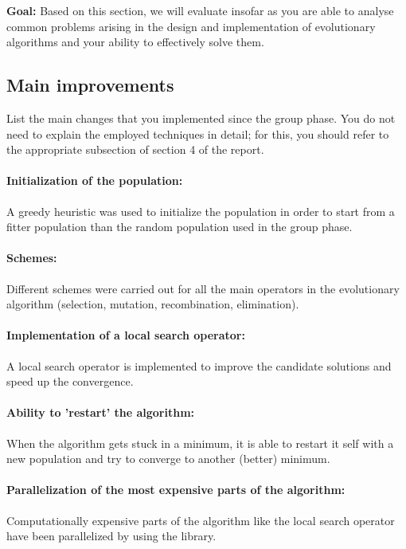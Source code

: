 \documentclass[a4paper,10pt]{article}
\newcommand{\ReplaceMe}[1]{{\color{blue}#1}}
\newcommand{\RemoveMe}[1]{{\color{purple}#1}}
\begin{document}
\RemoveMe{\textbf{Goal:} Based on this section, we will evaluate insofar as you are able to analyse common problems arising in the design and implementation of evolutionary algorithms and your ability to effectively solve them.}

\subsection{Main improvements}

\ReplaceMe{List the main changes that you implemented since the group phase. You do not need to explain the employed techniques in detail; for this, you should refer to the appropriate subsection of section 4 of the report.}

\paragraph{Initialization of the population:}A greedy heuristic was used to initialize the population in order to start from a fitter population than the random population used in the group phase.

\paragraph{Schemes:} Different schemes were carried out for all the main operators in the evolutionary algorithm (selection, mutation, recombination, elimination).

\paragraph{Implementation of a local search operator:} A local search operator is implemented to improve the candidate solutions and speed up the convergence.

\paragraph{Ability to 'restart' the algorithm:} When the algorithm gets stuck in a minimum, it is able to restart it self with a new population and try to converge to another (better) minimum.


\paragraph{Parallelization of the most expensive parts of the algorithm:} Computationally expensive parts of the algorithm like the local search operator have been parallelized by using the  library.
\end{document}
